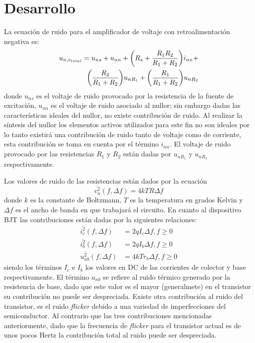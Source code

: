 \documentclass[letterpaper,10pt,twocolumn]{article}
\begin{document}
\section{Desarrollo}
La ecuaci\'on de ruido para el amplificador de voltaje con retroalimentaci\'on negativa es:
\begin{equation}\\
\begin{split}
u_{n,v_{total}}=u_{ns}+u_{nn}+\biggl(R_s+\frac{R_1R_2}{R_1+R_2}\biggr)i_{nn}+\\
\biggl(\frac{R_2}{R_1+R_2}\biggr)u_{nR_1}+\biggl(\frac{R_1}{R_1+R_2}\biggr)u_{nR_2}
\end{split}
\end{equation}
donde $u_{ns}$ es el voltaje de ruido provocado por la resistencia de la fuente de excitaci\'on, $u_{nn}$ es el voltaje de ruido asociado al nullor; sin embargo dadas las caracter\'isticas ideales del nullor, no existe contribuci\'on de ruido. Al realizar la s\'intesis del nullor los elementos activos utilizados para este fin no son ideales por lo tanto existir\'a una contribuci\'on de ruido tanto de voltaje como de corriente, esta contribuci\'on se toma en cuenta por el t\'ermino $i_{nn}$. El voltaje de ruido provocado por las resistencias $R_1$ y $R_2$ est\'an dadas por $u_{nR_1}$ y $u_{nR_2}$ respectivamente.

Los valores de ruido de las resistencias est\'an dados por la ecuaci\'on
\begin{equation}
\overline{v_n^2}(f,{\Delta}f)=4kTR{\Delta}f
\end{equation}
donde $k$ es la constante de Boltzmann, $T$ es la temperatura en grados Kelvin y ${\Delta}f$ es el ancho de banda en que trabajar\'a el circuito. En cuanto al dispositivo BJT las contribuciones est\'an dadas por la siguientes relaciones:
\begin{align}
\overline{i_c^2}(f,{\Delta}f)&=2qI_c{\Delta}f, f\geq0\\
\overline{i_b^2}(f,{\Delta}f)&=2qI_b{\Delta}f, f\geq0\\
\overline{u_{nb}^2}(f,{\Delta}f)&=4kTr_b{\Delta}f, f\geq0
\end{align}
siendo los t\'erminos $I_c$ e $I_b$ los valores en DC de las corrientes de colector y base respectivamente. El t\'ermino $u_{nb}$ se refiere al ruido t\'ermico generado por la resistencia de base, dado que este valor es el mayor (generalmete) en el transistor su contribuci\'on no puede ser despreciada. Existe otra contribuci\'on al ruido del transistor, es el ruido {\it flicker} debido a una variedad de imperfecciones del semiconductor. Al contrario que las tres contribuciones mencionadas anteriormente, dado que la frecuencia de {\it flicker} para el transistor actual es de unos pocos Hertz la contribuci\'on total al ruido puede ser despreciada.
\end{document}
